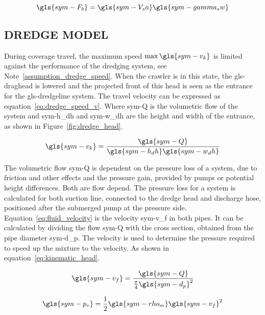 \begin{equation}
    \label{eq:buoyancy force}
    \gls{sym-F_b} = \gls{sym-V_sa} \gls{sym-gamma_sw}
\end{equation}

\subsection{DREDGE MODEL}\label{sec:dredge model}

During coverage travel, the maximum speed \(\max \gls{sym-v_k}\) is limited against the performance of the dredging
system, see Note~\ref{assumption_dredge_speed}. When the crawler is in this state, the \gls{gls-draghead} is lowered and
the projected front of this head is seen as the entrance for the \gls{gls-dredgeline} system. The travel velocity can be
expressed as equation~\ref{eq:dredge_speed_v}. Where \gls{sym-Q} is the volumetric flow of the system and \gls{sym-h_dh}
and \gls{sym-w_dh} are the height and width of the entrance, as shown in Figure~\ref{fig:dredge_head}.

\begin{equation}
    \label{eq:dredge_speed_v}
    \gls{sym-v_k} = \frac{\gls{sym-Q}}{\gls{sym-h_dh} \gls{sym-w_dh}}
\end{equation}

The volumetric flow \gls{sym-Q} is dependent on the pressure loss of a system, due to friction and other effects and the
pressure gain, provided by pumps or potential height differences. Both are flow depend. The pressure loss for a system
is calculated for both suction line, connected to the dredge head and discharge hose, positioned after the submerged
pump at the pressure side. Equation~\ref{eq:fluid_velocity} is the velocity \gls{sym-v_f} in both pipes. It can be
calculated by dividing the flow \gls{sym-Q} with the cross section, obtained from the pipe diameter \gls{sym-d_p}. The
velocity is used to determine the pressure required to speed up the mixture to the velocity. As shown in
equation~\ref{eq:kinematic_head}.

\begin{equation}
    \label{eq:fluid_velocity}
    \gls{sym-v_f} = \frac{\gls{sym-Q}}{\frac{\pi}{4} \gls{sym-d_p}^2}
\end{equation}

\begin{equation}
    \label{eq:kinematic_head}
    \gls{sym-p_v} = \frac{1}{2} \gls{sym-rho_m} \gls{sym-v_f}^2
\end{equation}

